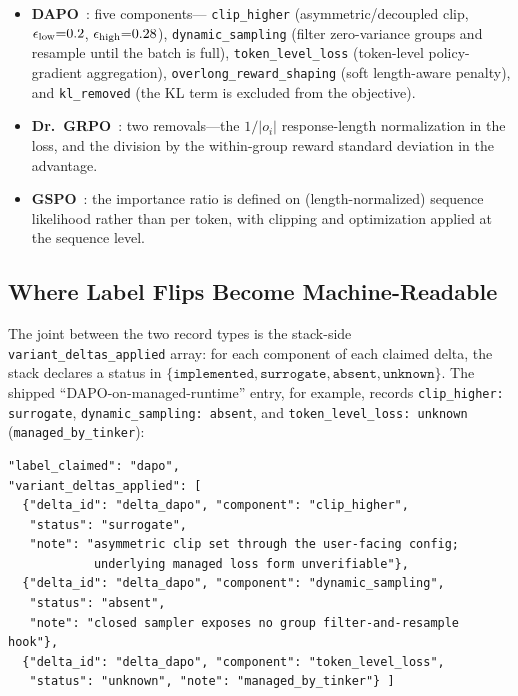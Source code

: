 \begin{itemize}[leftmargin=1.5em, itemsep=0.15em]
  \item \textbf{DAPO}~\citep{yu2025dapo}: five components---%
        \texttt{clip_higher} (asymmetric/decoupled clip,
        $\epsilon_{\text{low}}{=}0.2$, $\epsilon_{\text{high}}{=}0.28$),
        \texttt{dynamic_sampling} (filter zero-variance groups and resample
        until the batch is full), \texttt{token_level_loss} (token-level
        policy-gradient aggregation), \texttt{overlong_reward_shaping} (soft
        length-aware penalty), and \texttt{kl_removed} (the KL term is
        excluded from the objective).
  \item \textbf{Dr.~GRPO}~\citep{tong2025drgrpo}: two removals---the
        $1/|o_i|$ response-length normalization in the loss, and the division
        by the within-group reward standard deviation in the advantage.
  \item \textbf{GSPO}~\citep{qwen2025gspo}: the importance ratio is defined on
        (length-normalized) sequence likelihood rather than per token, with
        clipping and optimization applied at the sequence level.
\end{itemize}

\subsection{Where Label Flips Become Machine-Readable}
\label{sec:p6-schema-status}
The joint between the two record types is the stack-side
\texttt{variant_deltas_applied} array: for each component of each claimed
delta, the stack declares a status in
$\{\texttt{implemented}, \texttt{surrogate}, \texttt{absent},
\texttt{unknown}\}$. The shipped ``DAPO-on-managed-runtime'' entry, for
example, records \texttt{clip_higher: surrogate},
\texttt{dynamic_sampling: absent}, and \texttt{token_level_loss: unknown}
(\texttt{managed_by_tinker}):

\begin{lstlisting}[basicstyle=\ttfamily\scriptsize, frame=single,
  caption={Excerpt from \texttt{entries/tinker_dapo_qwen3.5-4b_gsm8k.json}.},
  label={lst:p6-dapo-entry}]
"label_claimed": "dapo",
"variant_deltas_applied": [
  {"delta_id": "delta_dapo", "component": "clip_higher",
   "status": "surrogate",
   "note": "asymmetric clip set through the user-facing config;
            underlying managed loss form unverifiable"},
  {"delta_id": "delta_dapo", "component": "dynamic_sampling",
   "status": "absent",
   "note": "closed sampler exposes no group filter-and-resample hook"},
  {"delta_id": "delta_dapo", "component": "token_level_loss",
   "status": "unknown", "note": "managed_by_tinker"} ]
\end{lstlisting}

